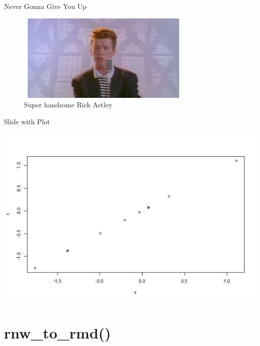 \documentclass[
  ignorenonframetext,
]{beamer}
\begin{document}
\begin{frame}{Never Gonna Give You Up}
\protect\hypertarget{never-gonna-give-you-up}{}

\begin{figure}
\centering
\includegraphics{foto.jpg}
\caption{Super handsome Rick Astley}
\end{figure}

\end{frame}

\begin{frame}{Slide with Plot}
\protect\hypertarget{slide-with-plot}{}

\scriptsize\includegraphics{prezentacja_pakietu_files/figure-beamer/unnamed-chunk-5-1.jpeg}

\end{frame}

\hypertarget{rnw_to_rmd}{%
\section{rnw\_to\_rmd()}\label{rnw_to_rmd}}
\end{document}
